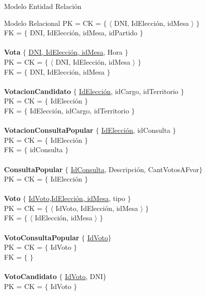 \begin{section}{Modelo Entidad Relaci\'on}
\begin{subsection}{Modelo Relacional}
PK = CK = $ \lbrace $ $ \langle $ DNI, IdElecci\'on, idMesa $ \rangle $ $ \rbrace $ \\
FK = $ \lbrace $ DNI, IdElecci\'on, idMesa, idPartido $ \rbrace $\\
\\
\textbf{Vota} $ \lbrace $ \underline{DNI, IdElecci\'on, idMesa}, Hora $ \rbrace $ \\
PK = CK = $ \lbrace $ $ \langle $ DNI, IdElecci\'on, idMesa $ \rangle $ $ \rbrace $ \\
FK = $ \lbrace $ DNI, IdElecci\'on, idMesa $ \rbrace $\\
\\
\textbf{VotacionCandidato} $ \lbrace $ \underline{IdElecci\'on}, idCargo, idTerritorio $ \rbrace $ \\
PK = CK = $ \lbrace $ IdElecci\'on $ \rbrace $ \\
FK = $ \lbrace $ IdElecci\'on, idCargo, idTerritorio $ \rbrace $\\
\\
\textbf{VotacionConsultaPopular} $ \lbrace $ \underline{IdElecci\'on}, idConsulta $ \rbrace $ \\
PK = CK = $ \lbrace $ IdElecci\'on $ \rbrace $ \\
FK = $ \lbrace $ idConsulta $ \rbrace $\\
\\
\textbf{ConsultaPopular} $ \lbrace $ \underline{IdConsulta}, Descripci\'on, CantVotosAFvor$ \rbrace $ \\
PK = CK = $ \lbrace $ IdElecci\'on $ \rbrace $ \\
\\
\textbf{Voto} $ \lbrace $ \underline{IdVoto,IdElecci\'on, idMesa}, tipo $ \rbrace $ \\
PK = CK = $ \lbrace $ $ \langle $ IdVoto, IdElecci\'on, idMesa $ \rangle $  $ \rbrace $ \\
FK = $ \lbrace $ $ \langle $ IdElecci\'on, idMesa $ \rangle $ $ \rbrace $\\
\\
\textbf{VotoConsultaPopular} $ \lbrace $ \underline{IdVoto}$ \rbrace $ \\
PK = CK = $ \lbrace $  IdVoto $ \rbrace $ \\
FK = $ \lbrace $  $ \rbrace $\\
\\
\textbf{VotoCandidato} $ \lbrace $ \underline{IdVoto}, DNI$ \rbrace $ \\
PK = CK = $ \lbrace $  IdVoto $ \rbrace $ \\

\end{subsection}
\end{section}
